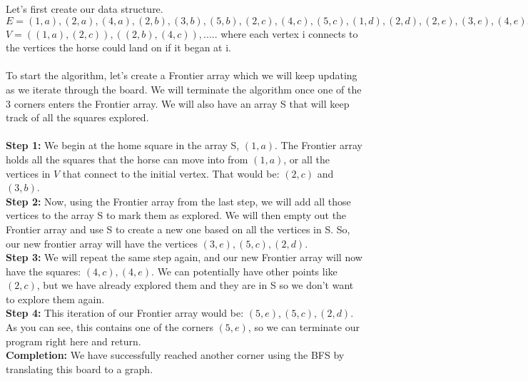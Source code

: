 \documentclass[11pt]{article}
\begin{document}
\begin{enumerate}
\begin{enumerate}
\begin{figure} [H]
\begin{tikzpicture}
    \end{tikzpicture}
    \end{figure}
    Let's first create our data structure. 
    \\ $E = {(1, a), (2, a), (4, a), (2, b), (3, b), (5, b), (2, c), (4, c), (5, c), (1, d), (2, d), (2, e), (3, e), (4, e), (5, e)}$
    \\ $V = ((1, a), (2, c)), ((2, b), (4, c)), .....$ where each vertex i connects to the vertices the horse could land on if it began at i.
    \\\\ To start the algorithm, let's create a Frontier array which we will keep updating as we iterate through the board. We will terminate the algorithm once one of the 3 corners enters the Frontier array. We will also have an array S that will keep track of all the squares explored.
    \\\\ \textbf{Step 1:} We begin at the home square in the array S, $(1, a)$. The Frontier array holds all the squares that the horse can move into from $(1, a)$, or all the vertices in $V$ that connect to the initial vertex. That would be: $(2, c)$ and $(3, b)$.
    \\ \textbf{Step 2: } Now, using the Frontier array from the last step, we will add all those vertices to the array S to mark them as explored. We will then empty out the Frontier array and use S to create a new one based on all the vertices in S. So, our new frontier array will have the vertices $(3, e), (5, c), (2, d)$.
    \\ \textbf{Step 3: } We will repeat the same step again, and our new Frontier array will now have the squares: $(4, c), (4, e)$. We can potentially have other points like $(2, c)$, but we have already explored them and they are in S so we don't want to explore them again.
    \\ \textbf{Step 4: } This iteration of our Frontier array would be: $(5, e), (5, c), (2, d)$. As you can see, this contains one of the corners $(5, e)$, so we can terminate our program right here and return.
    \\ \textbf{Completion:} We have successfully reached another corner using the BFS by translating this board to a graph.

    \end{enumerate}



\end{enumerate}
\end{document}
